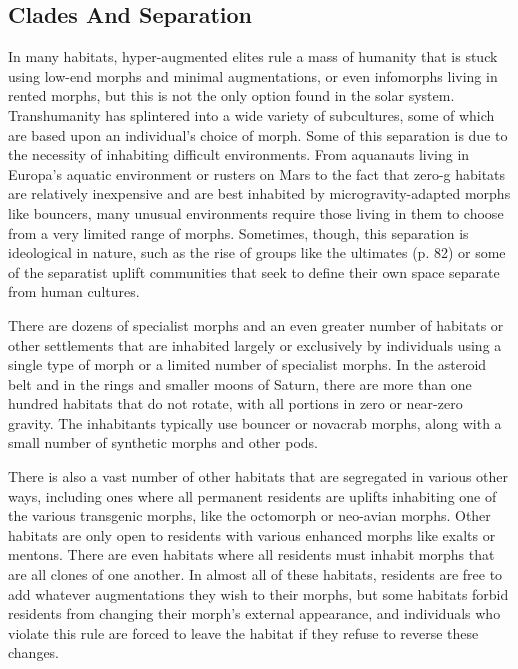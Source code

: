 \subsection{Clades And Separation}

In many habitats, hyper-augmented elites 
rule a mass of humanity that is stuck using 
low-end morphs and minimal augmentations, or even infomorphs living in rented 
morphs, but this is not the only option 
found in the solar system. Transhumanity 
has splintered into a wide variety of subcultures, some of which are based upon an 
individual's choice of morph. Some of this 
separation is due to the necessity of inhabiting difficult environments. From aquanauts 
living in Europa's aquatic environment or 
rusters on Mars to the fact that zero-g habitats are relatively inexpensive and are best 
inhabited by microgravity-adapted morphs 
like bouncers, many unusual environments 
require those living in them to choose from a very limited range of morphs. Sometimes, though, this separation 
is ideological in nature, such as the rise of groups like the 
ultimates (p. 82) or some of the separatist uplift communities that seek to define their own space separate from 
human cultures.

There are dozens of specialist morphs and an even 
greater number of habitats or other settlements that 
are inhabited largely or exclusively by individuals 
using a single type of morph or a limited number of 
specialist morphs. In the asteroid belt and in the rings 
and smaller moons of Saturn, there are more than one 
hundred habitats that do not rotate, with all portions 
in zero or near-zero gravity. The inhabitants typically 
use bouncer or novacrab morphs, along with a small 
number of synthetic morphs and other pods.

There is also a vast number of other habitats that 
are segregated in various other ways, including ones 
where all permanent residents are uplifts inhabiting 
one of the various transgenic morphs, like the octomorph or neo-avian morphs. Other habitats are only 
open to residents with various enhanced morphs like 
exalts or mentons. There are even habitats where all 
residents must inhabit morphs that are all clones of 
one another. In almost all of these habitats, residents 
are free to add whatever augmentations they wish to 
their morphs, but some habitats forbid residents from 
changing their morph's external appearance, and individuals who violate this rule are forced to leave the 
habitat if they refuse to reverse these changes.

